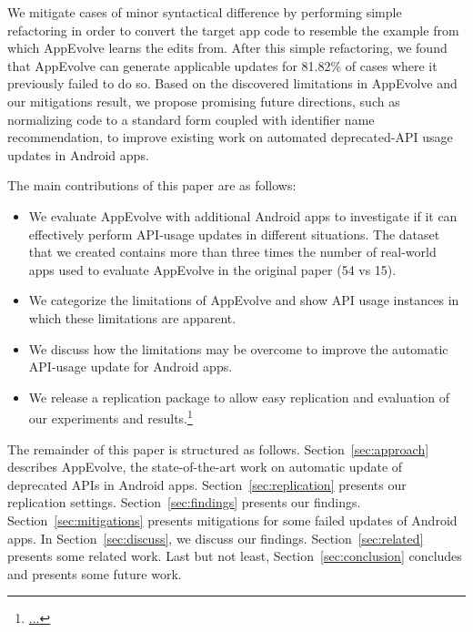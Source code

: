 We mitigate cases of minor syntactical difference by performing simple refactoring in order to convert the target app code to resemble the example from which AppEvolve learns the edits from. After this simple refactoring, we found that AppEvolve can generate applicable updates for 81.82\% of cases where it previously failed to do so. Based on the discovered limitations in AppEvolve and our mitigations result, we propose promising future directions, such as normalizing code to a standard form coupled with identifier name recommendation, to improve existing work on automated deprecated-API usage updates in Android apps.

The main contributions of this paper are as follows:
\begin{itemize}
	\item We  evaluate AppEvolve with additional Android apps to investigate if it can effectively perform API-usage updates in different situations. The dataset that we created contains more than three times the number of real-world apps used to evaluate AppEvolve in the original paper (54 vs 15).
	\item We categorize the limitations of AppEvolve and show API usage instances in which these limitations are apparent.
	\item We discuss how the limitations may be overcome to improve the automatic API-usage update for Android apps.
	\item We release a replication package to allow easy replication and evaluation of our experiments and results.\footnote{\url{...}}
\end{itemize}

The remainder of this paper is structured as follows. Section~\ref{sec:approach} describes AppEvolve, the state-of-the-art work on automatic update of deprecated APIs in Android apps. Section~\ref{sec:replication} presents our replication settings. Section~\ref{sec:findings} presents our findings. Section~\ref{sec:mitigations} presents mitigations for some failed updates of Android apps. In Section~\ref{sec:discuss}, we discuss our findings. Section~\ref{sec:related} presents some related work. Last but not least, Section~\ref{sec:conclusion} concludes and presents some future work.
